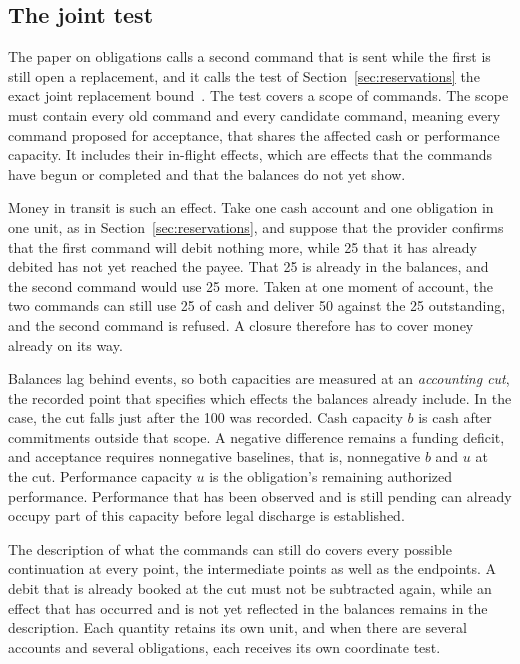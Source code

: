 \documentclass{momentum}
\begin{document}
\subsection{The joint test}
\label{sec:conditions-capacity}

The paper on obligations calls a second command that is sent while the first is still open a replacement, and it calls the test of Section~\ref{sec:reservations} the exact joint replacement bound~\cite[Section~5.2]{aot}. The test covers a scope of commands. The scope must contain every old command and every candidate command, meaning every command proposed for acceptance, that shares the affected cash or performance capacity. It includes their in-flight effects, which are effects that the commands have begun or completed and that the balances do not yet show.

Money in transit is such an effect. Take one cash account and one obligation in one unit, as in Section~\ref{sec:reservations}, and suppose that the provider confirms that the first command will debit nothing more, while 25 that it has already debited has not yet reached the payee. That 25 is already in the balances, and the second command would use 25 more. Taken at one moment of account, the two commands can still use 25 of cash and deliver 50 against the 25 outstanding, and the second command is refused. A closure therefore has to cover money already on its way.

Balances lag behind events, so both capacities are measured at an \emph{accounting cut}, the recorded point that specifies which effects the balances already include. In the case, the cut falls just after the 100 was recorded. Cash capacity $b$ is cash after commitments outside that scope. A negative difference remains a funding deficit, and acceptance requires nonnegative baselines, that is, nonnegative $b$ and $u$ at the cut. Performance capacity $u$ is the obligation's remaining authorized performance. Performance that has been observed and is still pending can already occupy part of this capacity before legal discharge is established.

The description of what the commands can still do covers every possible continuation at every point, the intermediate points as well as the endpoints. A debit that is already booked at the cut must not be subtracted again, while an effect that has occurred and is not yet reflected in the balances remains in the description. Each quantity retains its own unit, and when there are several accounts and several obligations, each receives its own coordinate test.
\end{document}
